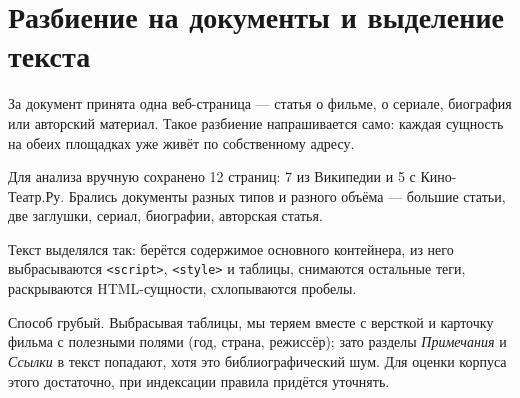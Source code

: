 \section{Разбиение на документы и выделение текста}

За документ принята одна веб-страница --- статья о фильме, о сериале, биография или
авторский материал. Такое разбиение напрашивается само: каждая сущность на обеих
площадках уже живёт по собственному адресу.

Для анализа вручную сохранено 12 страниц: 7 из Википедии и 5 с Кино-Театр.Ру. Брались
документы разных типов и разного объёма --- большие статьи, две заглушки, сериал,
биографии, авторская статья.

Текст выделялся так: берётся содержимое основного контейнера, из него выбрасываются
\texttt{<script>}, \texttt{<style>} и таблицы, снимаются остальные теги, раскрываются
HTML-сущности, схлопываются пробелы.

Способ грубый. Выбрасывая таблицы, мы теряем вместе с версткой и карточку фильма с
полезными полями (год, страна, режиссёр); зато разделы \emph{Примечания} и
\emph{Ссылки} в текст попадают, хотя это библиографический шум. Для оценки корпуса
этого достаточно, при индексации правила придётся уточнять.

\pagebreak
